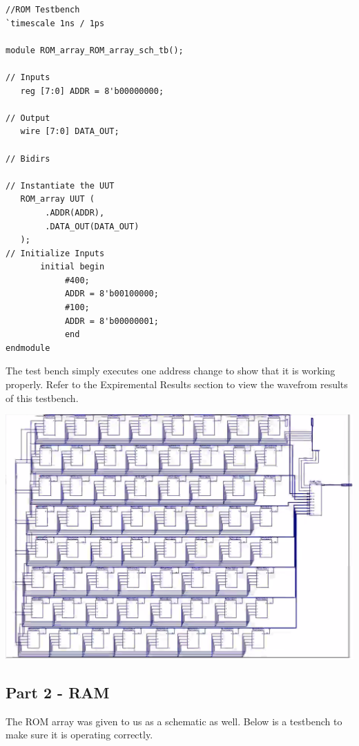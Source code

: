 \documentclass[12pt]{article}
\begin{document}
		
		\begin{Verbatim}[frame=single, fontsize= \small]
//ROM Testbench
`timescale 1ns / 1ps

module ROM_array_ROM_array_sch_tb();

// Inputs
   reg [7:0] ADDR = 8'b00000000;

// Output
   wire [7:0] DATA_OUT;

// Bidirs

// Instantiate the UUT
   ROM_array UUT (
		.ADDR(ADDR), 
		.DATA_OUT(DATA_OUT)
   );
// Initialize Inputs
       initial begin
			#400;
			ADDR = 8'b00100000;
			#100;
			ADDR = 8'b00000001;
			end
endmodule
		\end{Verbatim}
		The test bench simply executes one address change to show that it is working properly. Refer to the Expiremental Results section to view the wavefrom results of this testbench.
		\begin{center}
			\includegraphics[scale=.5]{ROM.PNG}
		\end{center}

		\newpage
		\subsection{Part 2 - RAM}
		The ROM array was given to us as a schematic as well. Below is a testbench to make sure it is operating correctly.
\end{document}

